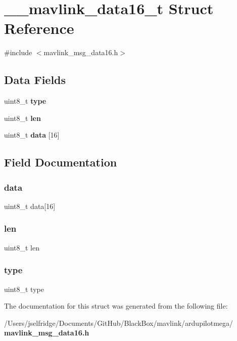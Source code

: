 \section{\+\_\+\+\_\+mavlink\+\_\+data16\+\_\+t Struct Reference}
\label{struct____mavlink__data16__t}


{\ttfamily \#include $<$mavlink\+\_\+msg\+\_\+data16.\+h$>$}

\subsection*{Data Fields}
\begin{DoxyCompactItemize}
\item 
uint8\+\_\+t \textbf{ type}
\item 
uint8\+\_\+t \textbf{ len}
\item 
uint8\+\_\+t \textbf{ data} [16]
\end{DoxyCompactItemize}


\subsection{Field Documentation}
\mbox{\label{struct____mavlink__data16__t_a2ddb79fb93f7d950e5cc9059ad5f7e02}} 
\subsubsection{data}
{\footnotesize\ttfamily uint8\+\_\+t data[16]}

\mbox{\label{struct____mavlink__data16__t_a5723e60ffd628510c699eddbce90be23}} 
\subsubsection{len}
{\footnotesize\ttfamily uint8\+\_\+t len}

\mbox{\label{struct____mavlink__data16__t_a1d127017fb298b889f4ba24752d08b8e}} 
\subsubsection{type}
{\footnotesize\ttfamily uint8\+\_\+t type}



The documentation for this struct was generated from the following file\+:\begin{DoxyCompactItemize}
\item 
/\+Users/jselfridge/\+Documents/\+Git\+Hub/\+Black\+Box/mavlink/ardupilotmega/\textbf{ mavlink\+\_\+msg\+\_\+data16.\+h}\end{DoxyCompactItemize}
